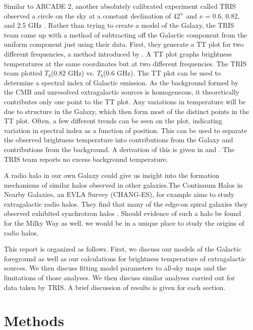 \documentclass[%
onecolumn,
11pt,
tightenlines,
notitlepage,
superscriptaddress,
nofootinbib,
amsmath,amssymb,
aps,
pra,
]{revtex4-1}
\begin{document}
Similar to ARCADE 2, another absolutely calibrated experiment called TRIS observed a circle on the sky at a constant declination of 42$\degree$ and $\nu$ = 0.6, 0.82, and 2.5 GHz \citep{Zannoni2008}. Rather than trying to create a model of the Galaxy, the TRIS team came up with a method of subtracting off the Galactic component from the uniform component just using their data. First, they generate a TT plot for two different frequencies, a method introduced by \cite{Turtle1962}. A TT plot graphs brightness temperatures at the same coordinates but at two different frequencies. The TRIS team plotted $T_b$(0.82 GHz) vs. $T_b$(0.6 GHz). The TT plot can be used to determine a spectral index of Galactic emission. As the background formed by the CMB and unresolved extragalactic sources is homogeneous, it theoretically contributes only one point to the TT plot. Any variations in temperature will be due to structure in the Galaxy, which then form most of the distinct points in the TT plot. Often, a few different trends can be seen on the plot, indicating variation in spectral index as a function of position. This can be used to separate the observed brightness temperature into contributions from the Galaxy and contributions from the background. A derivation of this is given in \cite{Gervasi2008} and \cite{Tartari2008}. The TRIS team reports no excess background temperature.

A radio halo in our own Galaxy could give us insight into the formation mechanisms of similar halos observed in other galaxies.The Continuum Halos in Nearby Galaxies, an EVLA Survey (CHANG-ES), for example aims to study extragalactic radio halos. They find that many of the edge-on spiral galaxies they observed exhibited synchrotron halos \citep{Wiegert2015}. Should evidence of such a halo be found for the Milky Way as well, we would be in a unique place to study the origins of radio halos.

This report is organized as follows. First, we discuss our models of the Galactic foreground as well as our calculations for brightness temperature of extragalactic sources. We then discuss fitting model parameters to all-sky maps and the limitations of those analyses. We then discuss similar analyses carried out for data taken by TRIS. A brief discussion of results is given for each section.


\section{Methods}
\end{document}
